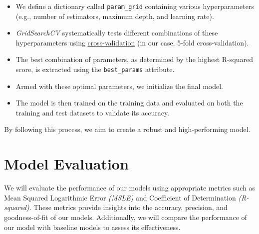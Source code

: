 \documentclass[conference]{IEEEtran}
\begin{document}
    \begin{itemize}
        \item We define a dictionary called \texttt{param\_grid} containing various hyperparameters (e.g., number of estimators, maximum depth, and learning rate).
        \item \textit{GridSearchCV} systematically tests different combinations of these hyperparameters using \href{https://scikit-learn.org/stable/modules/cross_validation.html}{cross-validation} (in our case, 5-fold cross-validation).
        \item The best combination of parameters, as determined by the highest R-squared score, is extracted using the \texttt{best\_params} attribute.
        \item Armed with these optimal parameters, we initialize the final model.
        \item The model is then trained on the training data and evaluated on both the training and test datasets to validate its accuracy.
    \end{itemize}

    By following this process, we aim to create a robust and high-performing model.

\section{Model Evaluation}
    We will evaluate the performance of our models using appropriate metrics such as Mean Squared Logarithmic Error \textit{(MSLE)} and Coefficient of Determination \textit{(R-squared)}. These metrics provide insights into the accuracy, precision, and goodness-of-fit of our models. Additionally, we will compare the performance of our model with baseline models to assess its effectiveness.
\end{document}
